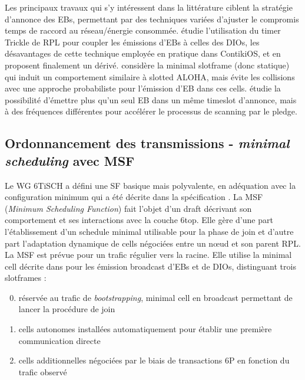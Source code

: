 \documentclass[]{report}
\begin{document}
\par Les principaux travaux qui s'y intéressent dans la littérature ciblent la stratégie d'annonce des EBs, permettant par des techniques variées d'ajuster le compromis temps de raccord au réseau/énergie consommée. \cite{join-TSCH-RPL} étudie l'utilisation du timer Trickle de RPL pour coupler les émissions d'EBs à celles des DIOs, les désavantages de cette technique employée en pratique dans ContikiOS, et en proposent finalement un dérivé. \cite{broadcast-strategies} considère la minimal slotframe (donc statique) qui induit un comportement similaire à slotted ALOHA, mais évite les collisions avec une approche probabiliste pour l'émission d'EB dans ces cells. \cite{ATP} étudie la possibilité d'émettre plus qu'un seul EB dans un même timeslot d'annonce, mais à des fréquences différentes pour accélérer le processus de scanning par le pledge.


\newpage

	\subsection{Ordonnancement des transmissions - \textit{minimal scheduling} avec MSF}
	\label{scheduling}

    Le WG 6TiSCH a défini une SF basique mais polyvalente, en adéquation avec la configuration minimum qui a été décrite dans la spécification \cite{ietf-6tisch-minimal-security-15}. La MSF (\textit{Minimum Scheduling Function}) fait l'objet d'un draft \cite{ietf-6tisch-msf-10} décrivant son comportement et ses interactions avec la couche 6top. Elle gère d'une part l'établissement d'un schedule minimal utilisable pour la phase de join et d'autre part l'adaptation dynamique de cells négociées entre un nœud et son parent RPL. La MSF est prévue pour un trafic régulier vers la racine. Elle utilise la minimal cell décrite dans \cite{ietf-6tisch-minimal-security-15} pour les émission broadcast d'EBs et de DIOs, distinguant trois slotframes :
    
\begin{enumerate}
\setcounter{enumi}{-1}
\item réservée au trafic de \textit{bootstrapping}, minimal cell en broadcast permettant de lancer la procédure de join
\item cells autonomes installées automatiquement pour établir une première communication directe
\item cells additionnelles négociées par le biais de transactions 6P en fonction du trafic observé
\end{enumerate}
\end{document}

